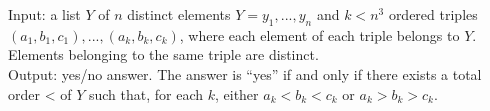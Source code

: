 \documentclass[runningheads]{llncs}
\begin{document}
\vskip5mm

\begin{definition}[Betweenness]
Input: a list $Y$ of $n$ distinct elements $Y=y_1,...,y_n$ and $k<n^3$ ordered triples $(a_1,b_1,c_1),..., (a_k,b_k,c_k)$, where each element of each triple belongs to $Y$. Elements belonging to the same triple are distinct.\\
Output: yes/no answer. The answer is ``yes'' if and only if there exists a total order < of $Y$ such that, for each $k$, either $a_k<b_k<c_k$ or $a_k>b_k>c_k$.
\end{definition}

\end{document}
